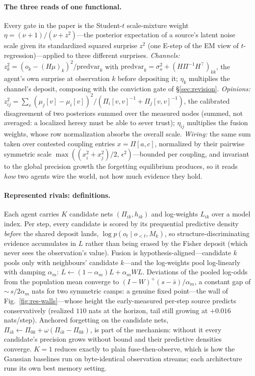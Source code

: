 \documentclass[runningheads]{llncs}
\begin{document}
\paragraph{The three reads of one functional.}
Every gate in the paper is the Student-$t$ scale-mixture weight
$\eta=(\nu+1)/(\nu+z^2)$---the posterior expectation of a source's latent noise scale given
its standardized squared surprise $z^2$ (one E-step of the EM view of $t$-regression)---applied
to three different surprises. \emph{Channels:} $z_k^2=(o_k-(H\mu)_k)^2/\mathrm{predvar}_k$ with
$\mathrm{predvar}_k=\sigma_o^2+(H\Pi^{-1}H^{\!\top})_{kk}$, the agent's own surprise at
observation $k$ before depositing it; $\eta_k$ multiplies the channel's deposit, composing
with the conviction gate of \S\ref{sec:revision}. \emph{Opinions:}
$z_{ij}^2=\sum_v(\mu_j[v]-\mu_i[v])^2/(\Pi_i[v,v]^{-1}+\Pi_j[v,v]^{-1})$, the calibrated
disagreement of two posteriors summed over the measured nodes (summed, not averaged: a localized
heresy must be able to sever trust); $\eta_{ij}$ multiplies the fusion weights, whose row
normalization absorbs the overall scale. \emph{Wiring:} the same sum taken over contested
coupling entries $x=\Pi[a,c]$, normalized by their pairwise symmetric scale
$\max((x_i^2+x_j^2)/2,\,\epsilon^2)$---bounded per coupling, and invariant to the global
precision growth the forgetting equilibrium produces, so it reads \emph{how} two agents wire
the world, not how much evidence they hold.

\paragraph{Represented rivals: definitions.}
Each agent carries $K$ candidate nets $(\Pi_{ik},h_{ik})$ and log-weights $L_{ik}$ over a
model index. Per step, every candidate is scored by its prequential predictive density
\emph{before} the shared deposit lands, $\log p(o_t\mid o_{<t},M_k)$, so
structure-discriminating evidence accumulates in $L$ rather than being erased by the Fisher
deposit (which never sees the observation's value). Fusion is hypothesis-aligned---candidate
$k$ pools only with neighbours' candidate $k$---and the log-weights pool log-linearly with
damping $\alpha_m$: $L\leftarrow(1-\alpha_m)L+\alpha_m WL$. Deviations of the pooled log-odds
from the population mean converge to $(I-W)^{+}(s-\bar s)/\alpha_m$, a constant gap of
${\sim}\,s/2\alpha_m$ nats for two symmetric camps: a genuine fixed point---the wall of
Fig.~\ref{fig:res-walls}---whose height the early-measured per-step source predicts
conservatively (realized $110$ nats at the horizon, tail still growing at $+0.016$ nats/step).
Anchored forgetting on the candidate nets,
$\Pi_{ik}\leftarrow\Pi_{0k}+\omega(\Pi_{ik}-\Pi_{0k})$, is part of the mechanism: without it
every candidate's precision grows without bound and their predictive densities converge. $K=1$
reduces exactly to plain fuse-then-observe, which is how the Gaussian baselines run on
byte-identical observation streams; each architecture runs its own best memory setting.
\end{document}
